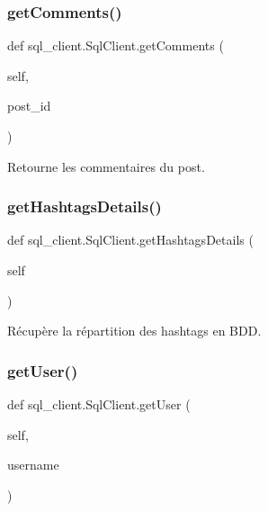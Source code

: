 \subsubsection{\texorpdfstring{get\+Comments()}{getComments()}}
{\footnotesize\ttfamily def sql\+\_\+client.\+Sql\+Client.\+get\+Comments (\begin{DoxyParamCaption}\item[{}]{self,  }\item[{}]{post\+\_\+id }\end{DoxyParamCaption})}

\begin{DoxyVerb}Retourne les commentaires du post.
\end{DoxyVerb}
 \mbox{\label{classsql__client_1_1_sql_client_a17678dbe8928fffbcb625bbdf33786c6}} 
\subsubsection{\texorpdfstring{get\+Hashtags\+Details()}{getHashtagsDetails()}}
{\footnotesize\ttfamily def sql\+\_\+client.\+Sql\+Client.\+get\+Hashtags\+Details (\begin{DoxyParamCaption}\item[{}]{self }\end{DoxyParamCaption})}

\begin{DoxyVerb}Récupère la répartition des hashtags en BDD.
\end{DoxyVerb}
 \mbox{\label{classsql__client_1_1_sql_client_aabd735d4f088517fb4354be42713a65d}} 
\subsubsection{\texorpdfstring{get\+User()}{getUser()}}
{\footnotesize\ttfamily def sql\+\_\+client.\+Sql\+Client.\+get\+User (\begin{DoxyParamCaption}\item[{}]{self,  }\item[{}]{username }\end{DoxyParamCaption})}

